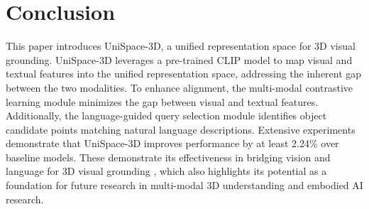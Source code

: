\documentclass[lettersize,journal]{IEEEtran}
\begin{document}
\section{Conclusion} \label{sec:Conculsion}
This paper introduces UniSpace-3D, a unified representation space for 3D visual grounding. UniSpace-3D leverages a pre-trained CLIP model to map visual and textual features into the unified representation space, addressing the inherent gap between the two modalities.  To enhance alignment, the multi-modal contrastive learning module minimizes the gap between visual and textual features.   Additionally, the language-guided query selection module identifies object candidate points matching natural language descriptions.  Extensive experiments demonstrate that UniSpace-3D improves performance by at least 2.24\% over baseline models. These demonstrate its effectiveness in bridging vision and language for 3D visual grounding , which also highlights its potential as a foundation for future research in multi-modal 3D understanding and embodied AI research.










\vfill
\end{document}
